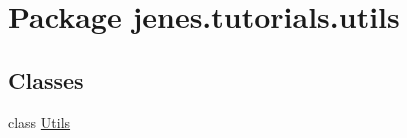 \hypertarget{namespacejenes_1_1tutorials_1_1utils}{\section{Package jenes.\-tutorials.\-utils}
\label{namespacejenes_1_1tutorials_1_1utils}
}
\subsection*{Classes}
\begin{DoxyCompactItemize}
\item 
class \hyperlink{classjenes_1_1tutorials_1_1utils_1_1_utils}{Utils}
\end{DoxyCompactItemize}
